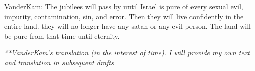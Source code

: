 
\begin{ethiopictext}
\end{ethiopictext}

\begin{transliteration}
\end{transliteration}

\begin{translation}
    VanderKam: The jubilees will pass by until Israel is pure of every sexual evil, impurity, contamination, sin, and error. Then they will live confidently in the entire land. they will no longer have any satan or any evil person. The land will be pure from that time until eternity.

    \emph{**VanderKam's translation (in the interest of time). I will provide my own text and translation in subsequent drafts}
\end{translation}
